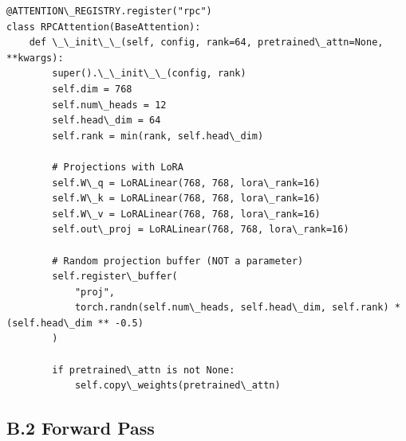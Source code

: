 \begin{lstlisting}
@ATTENTION\_REGISTRY.register("rpc")
class RPCAttention(BaseAttention):
    def \_\_init\_\_(self, config, rank=64, pretrained\_attn=None, **kwargs):
        super().\_\_init\_\_(config, rank)
        self.dim = 768
        self.num\_heads = 12
        self.head\_dim = 64
        self.rank = min(rank, self.head\_dim)
        
        # Projections with LoRA
        self.W\_q = LoRALinear(768, 768, lora\_rank=16)
        self.W\_k = LoRALinear(768, 768, lora\_rank=16)
        self.W\_v = LoRALinear(768, 768, lora\_rank=16)
        self.out\_proj = LoRALinear(768, 768, lora\_rank=16)
        
        # Random projection buffer (NOT a parameter)
        self.register\_buffer(
            "proj",
            torch.randn(self.num\_heads, self.head\_dim, self.rank) * (self.head\_dim ** -0.5)
        )
        
        if pretrained\_attn is not None:
            self.copy\_weights(pretrained\_attn)
\end{lstlisting}

\subsection{B.2 Forward Pass}


